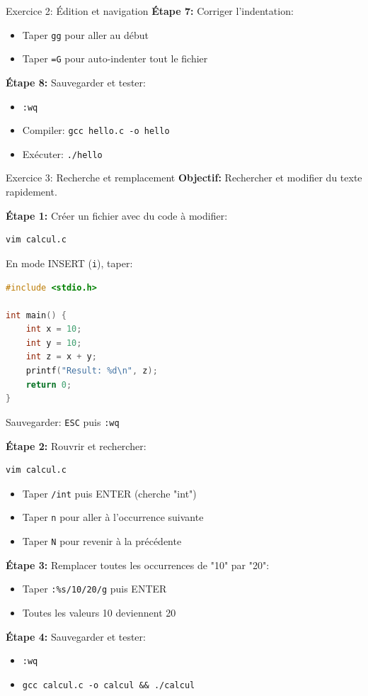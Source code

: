 \documentclass[10pt,a4paper]{article}
\begin{document}
\begin{exercicebox}{Exercice 2: Édition et navigation}
\textbf{Étape 7:} Corriger l'indentation:
\begin{itemize}
\item Taper \texttt{gg} pour aller au début
\item Taper \texttt{=G} pour auto-indenter tout le fichier
\end{itemize}

\textbf{Étape 8:} Sauvegarder et tester:
\begin{itemize}
\item \texttt{:wq}
\item Compiler: \texttt{gcc hello.c -o hello}
\item Exécuter: \texttt{./hello}
\end{itemize}
\end{exercicebox}

\begin{exercicebox}{Exercice 3: Recherche et remplacement}
\textbf{Objectif:} Rechercher et modifier du texte rapidement.

\textbf{Étape 1:} Créer un fichier avec du code à modifier:
\begin{verbatim}
vim calcul.c
\end{verbatim}

En mode INSERT (\texttt{i}), taper:
\begin{lstlisting}[language=C]
#include <stdio.h>

int main() {
    int x = 10;
    int y = 10;
    int z = x + y;
    printf("Result: %d\n", z);
    return 0;
}
\end{lstlisting}

Sauvegarder: \texttt{ESC} puis \texttt{:wq}

\textbf{Étape 2:} Rouvrir et rechercher:
\begin{verbatim}
vim calcul.c
\end{verbatim}

\begin{itemize}
\item Taper \texttt{/int} puis ENTER (cherche "int")
\item Taper \texttt{n} pour aller à l'occurrence suivante
\item Taper \texttt{N} pour revenir à la précédente
\end{itemize}

\textbf{Étape 3:} Remplacer toutes les occurrences de "10" par "20":
\begin{itemize}
\item Taper \texttt{:\%s/10/20/g} puis ENTER
\item Toutes les valeurs 10 deviennent 20
\end{itemize}

\textbf{Étape 4:} Sauvegarder et tester:
\begin{itemize}
\item \texttt{:wq}
\item \texttt{gcc calcul.c -o calcul \&\& ./calcul}
\end{itemize}
\end{exercicebox}
\end{document}
